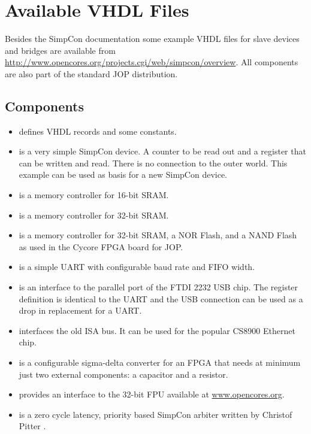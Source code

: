 \section{Available VHDL Files}

Besides the SimpCon documentation some example VHDL files for slave
devices and bridges are available from
\url{http://www.opencores.org/projects.cgi/web/simpcon/overview}.
All components are also part of the standard JOP distribution.


\subsection{Components}

\begin{itemize}
    \item {} defines VHDL records and some
    constants.
    \item {} is a very simple SimpCon device. A
    counter to be read out and a register that can be written and
    read. There is no connection to the outer world. This example
    can be used as basis for a new SimpCon device.
    \item {} is a memory controller for 16-bit
    SRAM.
    \item {} is a memory controller for 32-bit
    SRAM.
    \item {} is a memory controller for 32-bit
    SRAM, a NOR Flash, and a NAND Flash as used in the Cycore FPGA board for JOP.
    \item {} is a simple UART with configurable
    baud rate and FIFO width.
    \item {} is an interface to the parallel port of
    the FTDI 2232 USB chip. The register definition is identical to
    the UART and the USB connection can be used as a drop in
    replacement for a UART.
    \item {} interfaces the old ISA bus. It can be used
    for the popular CS8900 Ethernet chip.
    \item {} is a configurable sigma-delta converter
    for an FPGA that needs at minimum just two external components:
    a capacitor and a resistor.
    \item {} provides an interface to the 32-bit FPU available
    at \url{www.opencores.org}.
    \item {} is a zero cycle latency, priority
    based SimpCon arbiter written by Christof Pitter \cite{jop:cmp}.
\end{itemize}

